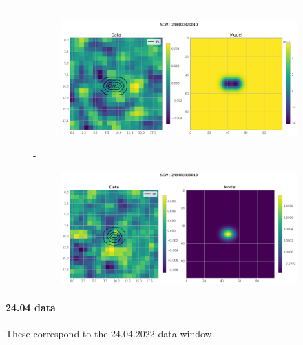 \documentclass[
	a4paper, %
	10pt, %
	unnumberedsections, %
	twoside, %
]{LTJournalArticle}
\begin{document}
\begin{figure}[H]
\begin{subfigure}{.47\textwidth}
    \end{subfigure}
    \hspace{1em}-
    \begin{subfigure}{.47\textwidth}
        \includegraphics[width=\textwidth]{report/Figures/models/2204/32_psf_const.png}
    \end{subfigure}%
    \hspace{1em}-
    \begin{subfigure}{.47\textwidth}
        \centering
        \includegraphics[width=\textwidth]{report/Figures/models/2204/33_psf_const.png}
    \end{subfigure}
    \caption{}
    \label{model_notconst_22}
    \end{figure}
\paragraph{24.04 data}
These correspond to the 24.04.2022 data window.
\end{document}
